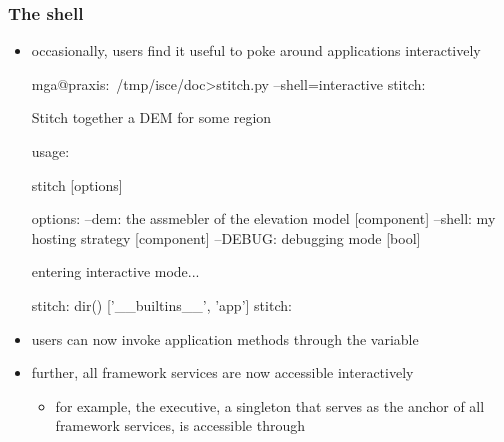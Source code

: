\begin{frame}[fragile]
%
  \frametitle{The  shell}
%
  \begin{itemize}
%
  \item occasionally, users find it useful to poke around applications interactively
%
    \begin{ish}[gobble=4]{}
      mga@praxis:~/tmp/isce/doc>stitch.py --shell=interactive
      stitch:

          Stitch together a DEM for some region

      usage:

          stitch [options]

      options:
            --dem: the assmebler of the elevation model [component]
          --shell: my hosting strategy [component]
          --DEBUG: debugging mode [bool]

      entering interactive mode...

      stitch: dir()
      ['__builtins__', 'app']
      stitch:
    \end{ish}
%
  \item users can now invoke application methods through the variable 
%
  \item further, all framework services are now accessible interactively
    \begin{itemize}
    \item for example, the executive, a singleton\supercite{patterns} that serves as the anchor
      of all framework services, is accessible through 
    \end{itemize}
%
  \end{itemize}
%
\end{frame}

